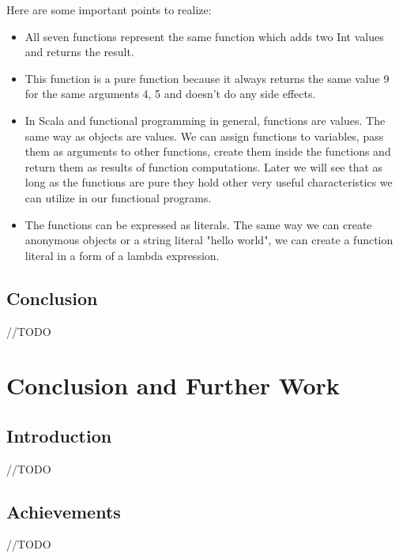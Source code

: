 \documentclass[12pt,twoside,a4paper]{report}
\begin{document}
Here are some important points to realize:

\begin{itemize}
\item All seven functions represent the same function which adds two Int values and returns the result.
\item This function is a pure function because it always returns the same value 9 for the same arguments 4, 5 and doesn't do any side effects.
\item In Scala and functional programming in general, functions are values. The same way as objects are values. We can assign functions to variables, pass them as arguments to other functions, create them inside the functions and return them as results of function computations. Later we will see that as long as the functions are pure they hold other very useful characteristics we can utilize in our functional programs.
\item The functions can be expressed as literals. The same way we can create anonymous objects or a string literal "hello world", we can create a function literal in a form of a lambda expression.
\end{itemize}

\section{Conclusion}\label{6.10}
//TODO











\chapter{Conclusion and Further Work}\label{7}

\section{Introduction}\label{7.1}
//TODO

\section{Achievements}\label{7.2}
//TODO
\end{document}
